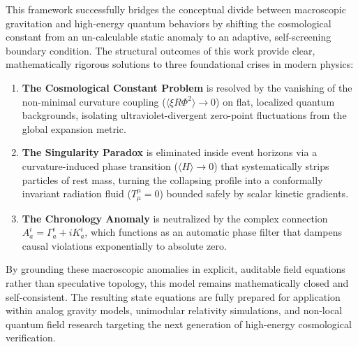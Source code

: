 This framework successfully bridges the conceptual divide between
macroscopic gravitation and high-energy quantum behaviors by shifting
the cosmological constant from an un-calculable static anomaly to an
adaptive, self-screening boundary condition. The structural outcomes of
this work provide clear, mathematically rigorous solutions to three
foundational crises in modern physics:

\begin{enumerate}
\def\labelenumi{\arabic{enumi}.}
\tightlist
\item
  \textbf{The Cosmological Constant Problem} is resolved by the
  vanishing of the non-minimal curvature coupling
  (\(\langle \xi R \Phi^2 \rangle \to 0\)) on flat, localized quantum
  backgrounds, isolating ultraviolet-divergent zero-point fluctuations
  from the global expansion metric.
\item
  \textbf{The Singularity Paradox} is eliminated inside event horizons
  via a curvature-induced phase transition (\(\langle H \rangle \to 0\))
  that systematically strips particles of rest mass, turning the
  collapsing profile into a conformally invariant radiation fluid
  (\(T^\mu_\mu = 0\)) bounded safely by scalar kinetic gradients.
\item
  \textbf{The Chronology Anomaly} is neutralized by the complex
  connection \(A_a^i = \Gamma_a^i + i K_a^i\), which functions as an
  automatic phase filter that dampens causal violations exponentially to
  absolute zero.
\end{enumerate}

By grounding these macroscopic anomalies in explicit, auditable field
equations rather than speculative topology, this model remains
mathematically closed and self-consistent. The resulting state equations
are fully prepared for application within analog gravity models,
unimodular relativity simulations, and non-local quantum field research
targeting the next generation of high-energy cosmological verification.
